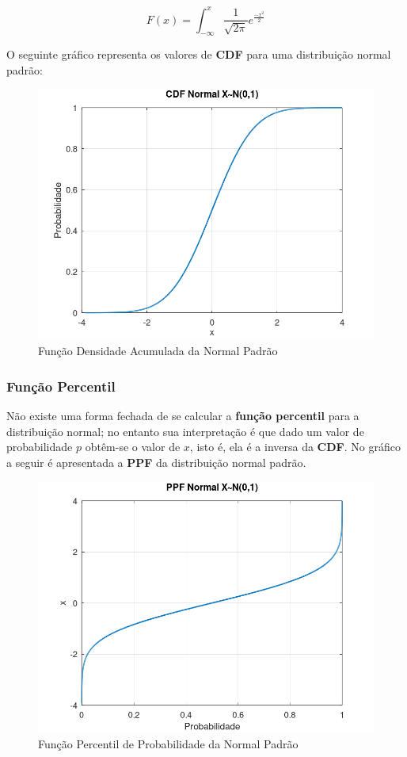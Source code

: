 \documentclass[
]{book}
\begin{document}
\begin{equation}
  F(x) = \int_{-\infty}^x \frac{1}{\sqrt{2 \pi}} e^{\frac{-x^2}{2}}
\end{equation}

O seguinte gráfico representa os valores de \textbf{CDF} para uma distribuição normal padrão:

\begin{figure}

{\centering \includegraphics[width=0.5\linewidth]{images/normalcdf} 

}

\caption{Função Densidade Acumulada da Normal Padrão}\label{fig:unnamed-chunk-2}
\end{figure}

\hypertarget{funuxe7uxe3o-percentil}{%
\subsubsection*{Função Percentil}\label{funuxe7uxe3o-percentil}}

Não existe uma forma fechada de se calcular a \textbf{função percentil} para a distribuição normal; no entanto sua interpretação é que dado um valor de probabilidade \(p\) obtêm-se o valor de \(x\), isto é, ela é a inversa da \textbf{CDF}. No gráfico a seguir é apresentada a \textbf{PPF} da distribuição normal padrão.

\begin{figure}

{\centering \includegraphics[width=0.5\linewidth]{images/normalppf} 

}

\caption{Função Percentil de Probabilidade da Normal Padrão}\label{fig:unnamed-chunk-3}
\end{figure}
\end{document}
